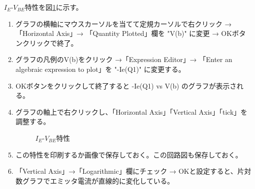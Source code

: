 \vspace{-1\baselineskip}
$I_E$-$V_{BE}$特性を図\ref{ie_vbe}に示す。
\begin{enumerate}
  \setlength{\parskip}{0cm} %
  \setlength{\itemsep}{0cm} %
  \item グラフの横軸にマウスカーソルを当てて定規カーソルで右クリック →「Horizontal Axis」→ 「Quantity Plotted」欄を "V(b)" に変更 → OKボタンクリックで終了。
  \item グラフの凡例のV(b)をクリック →「Expression Editor」→ 「Enter an algebraic expression to plot」を "-Ie(Q1)" に変更する。
  \item OKボタンをクリックして終了すると -Ie(Q1) vs V(b) のグラフが表示される。
  \item グラフの軸上で右クリックし、「Horizontal Axis」「Vertical Axis」「tick」を調整する。
  \begin{figure}[htb]
    \begin{center}
    \caption{$I_E$-$V_{BE}$特性}
    \label{ie_vbe}
    \end{center}
  \end{figure}
  \item この特性を印刷するか画像で保存しておく。この回路図も保存しておく。
  \item 「Vertical Axis」→「Logarithmic」欄にチェック → OKと設定すると、片対数グラフでエミッタ電流が直線的に変化している。
\end{enumerate}

